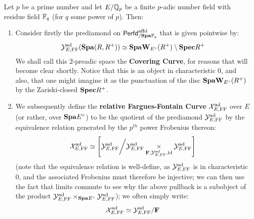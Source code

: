                 \begin{definition} \label{def: the_fargues_fontaine_curve}
                    Let $p$ be a prime number and let $E/\mathbb{Q}_p$ be a finite $p$-adic number field with residue field $\mathbb{F}_q$ (for $q$ some power of $p$). Then:
                        \begin{enumerate}
                            \item Consider firstly the prediamond on $\mathsf{Perfd}^{\mathrm{affd}}_{/\mathbf{Spa} \mathbb{F}_q}$ that is given pointwise by:
                                $$\mathcal{Y}^{\mathrm{ad}}_{E, \mathrm{FF}}(\mathbf{Spa}(R, R^+)) \simeq \mathbf{Spa} \mathbf{W}_{E^{\circ}}(R^+) \setminus \mathbf{Spec} R^+$$
                            We shall call this $2$-preadic space the \textbf{Covering Curve}, for reasons that will become clear shortly. Notice that this is an object in characteristic $0$, and also, that one might imagine it as the punctuation of the disc $\mathbf{Spa} \mathbf{W}_{E^{\circ}}(R^+)$ by the Zariski-closed  $\mathbf{Spec} R^+$.
                            \item We subsequently define the \textbf{relative Fargues-Fontain Curve} $\mathcal{X}^{\mathrm{ad}}_{E, \mathrm{FF}}$ over $E$ (or rather, over $\mathbf{Spa} E^{\circ}$) to be the quotient of the prediamond $\mathcal{Y}^{\mathrm{ad}}_{E, \mathrm{FF}}$ by the equivalence relation generated by the $p^{th}$ power Frobenius thereon:
                                $$\calX^{\ad}_{E, \FF} \cong \left[\calY^{\ad}_{E, \FF} \bigg/ \calY^{\ad}_{E, \FF} \x_{\Frob, \calY^{\ad}_{E, \FF}, \id} \calY^{\ad}_{E, \FF}\right]$$
                            (note that the equivalence relation is well-define, as $\mathcal{Y}^{\mathrm{ad}}_{E, \mathrm{FF}}$ is in characteristic $0$, and the associated Frobenius must therefore be injective; we can then use the fact that limits commute to see why the above pullback is a subobject of the product $\calY^{\ad}_{E, \FF} \x_{\Spa E^{\circ}} \calY^{\ad}_{E, \FF}$); we often simply write:
                                $$\mathcal{X}^{\mathrm{ad}}_{E, \mathrm{FF}} \simeq \mathcal{Y}^{\mathrm{ad}}_{E, \mathrm{FF}}/\mathbf{F}$$
                        \end{enumerate}
                \end{definition}
